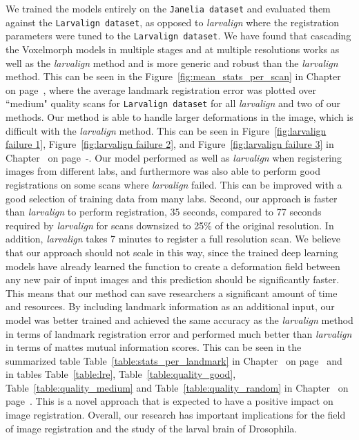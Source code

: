 \documentclass{book}
\begin{document}
	We trained the models entirely on the \texttt{Janelia dataset} and evaluated them against the \texttt{Larvalign dataset}, as opposed to \textit{larvalign} where the registration parameters were tuned to the \texttt{Larvalign dataset}. We have found that cascading the Voxelmorph models in multiple stages and at multiple resolutions works as well as the \textit{larvalign} method and is more generic and robust than the \textit{larvalign} method. This can be seen in the Figure~\ref{fig:mean_stats_per_scan} in Chapter~ on page~\pageref{fig:mean_stats_per_scan}, where the average landmark registration error was plotted over ``medium" quality scans for \texttt{Larvalign dataset} for all \textit{larvalign} and two of our methods. Our method is able to handle larger deformations in the image, which is difficult with the \textit{larvalign} method. This can be seen in Figure~\ref{fig:larvalign failure 1}, Figure~\ref{fig:larvalign failure 2}, and Figure~\ref{fig:larvalign failure 3} in Chapter~ on page~\pageref{fig:larvalign failure 1}-\pageref{fig:larvalign failure 3}. Our model performed as well as \textit{larvalign} when registering images from different labs, and furthermore was also able to perform good registrations on some scans where \textit{larvalign} failed. This can be improved with a good selection of training data from many labs. Second, our approach is faster than \textit{larvalign} to perform registration, 35 seconds, compared to 77 seconds required by \textit{larvalign} for scans downsized to 25\% of the original resolution. In addition, \textit{larvalign} takes 7 minutes to register a full resolution scan. We believe that our approach should not scale in this way, since the trained deep learning models have already learned the function to create a deformation field between any new pair of input images and this prediction should be significantly faster. This means that our method can save researchers a significant amount of time and resources. By including landmark information as an additional input, our model was better trained and achieved the same accuracy as the \textit{larvalign} method in terms of landmark registration error and performed much better than \textit{larvalign} in terms of mattes mutual information scores. This can be seen in the summarized table Table~\ref{table:stats_per_landmark} in Chapter~ on page~\pageref{table:stats_per_landmark} and in tables Table~\ref{table:lre}, Table~\ref{table:quality_good}, Table~\ref{table:quality_medium} and Table~\ref{table:quality_random} in Chapter~ on page~\pageref{table:lre}. This is a novel approach that is expected to have a positive impact on image registration. Overall, our research has important implications for the field of image registration and the study of the larval brain of Drosophila.
	
\end{document}
